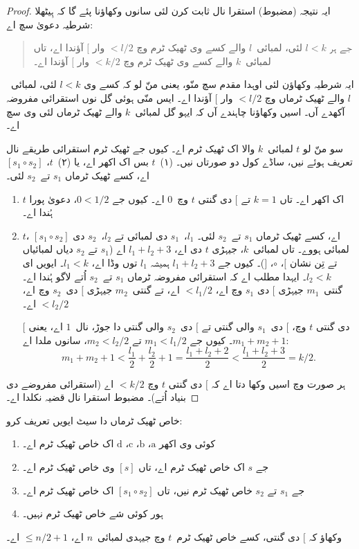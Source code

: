 \documentclass[../../../include/open-logic-section]{subfiles}
\begin{document}
\begin{proof}
ایہ نتیجہ (مضبوط) استقرا نال ثابت کرن لئی سانوں وکھاؤنا پئے گا کہ ہِیٹھلا شرطیہ دعویٰ سچ اے:
\begin{quote}
  جے ہر $l < k$ لئی، لمبائی~$l$ والے کسے وی ٹھیک ٹرم وچ $< l/2$ وار $[$ آؤندا اے، تاں لمبائی~$k$ والے کسے وی ٹھیک ٹرم وچ $< k/2$ وار $[$ آؤندا اے۔
\end{quote}
ایہ شرطیہ وکھاؤن لئی اوہدا مقدم سچ منّو، یعنی منّ لو کہ کسے وی $l<k$ لئی، لمبائی~$l$ والے ٹھیک ٹرماں وچ $< l/2$ وار $[$ آؤندا اے۔ ایس منّی ہوئی گل نوں استقرائی مفروضہ آکھدے آں۔ اسیں وکھاؤنا چاہندے آں کہ ایہو گل لمبائی~$k$ والے ٹھیک ٹرماں لئی وی سچ اے۔

سو منّ لو $t$ لمبائی~$k$ والا اک ٹھیک ٹرم اے۔ کیوں جے ٹھیک ٹرم استقرائی طریقے نال تعریف ہوئے نیں، ساڈے کول دو صورتاں نیں۔ (۱)~$t$ بس اک اکھر اے، یا (۲)~$t$، $[s_1 \circ s_2]$ اے، کسے ٹھیک ٹرماں $s_1$ تے~$s_2$ لئی۔
\begin{enumerate}
\item $t$ اک اکھر اے۔ تاں $k = 1$ تے $[$ دی گنتی $t$ وچ~$0$ اے۔ کیوں جے $0 < 1/2$، دعویٰ پورا ہُندا اے۔
\item $t$، $[s_1 \circ s_2]$ اے، کسے ٹھیک ٹرماں $s_1$ تے~$s_2$ لئی۔ $l_1$،~$s_1$ دی لمبائی تے $l_2$،~$s_2$ دی لمبائی ہووے۔ تاں لمبائی~$k$، جیہڑی $t$ دی اے، $l_1+l_2+3$ اے ($s_1$ تے $s_2$ دیاں لمبائیاں تے تِن نشان $[$، $\circ$، $]$)۔ کیوں جے $l_1+l_2+3$ ہمیشہ $l_1$ توں وڈا اے، $l_1 < k$۔ ایویں ای $l_2
  < k$۔ ایہدا مطلب اے کہ استقرائی مفروضہ ٹرماں $s_1$ تے~$s_2$ اُتے لاگو ہُندا اے۔ گنتی~$m_1$ جیہڑی $[$ دی $s_1$ وچ اے، $< l_1/2$ اے، تے گنتی~$m_2$ جیہڑی $[$ دی~$s_2$ وچ اے، $< l_2/2$ اے۔

  $[$ دی گنتی $t$ وچ، $[$ دی~$s_1$ والی گنتی تے $[$ دی~$s_2$ والی گنتی دا جوڑ، نال~$1$ اے، یعنی $m_1 + m_2 + 1$۔ کیوں جے $m_1
  < l_1/2$ تے $m_2 < l_2/2$، سانوں ملدا اے:
  \[
  m_1 + m_2 + 1 < \frac{l_1}{2} + \frac{l_2}{2} + 1 = \frac{l_1+l_2+2}{2} < \frac{l_1+l_2+3}{2} = k/2.
  \]
\end{enumerate}
ہر صورت وچ اسیں وکھا دتا اے کہ $[$ دی گنتی $t$ وچ $< k/2$ اے (استقرائی مفروضے دی بنیاد اُتے)۔ مضبوط استقرا نال قضیہ نکلدا اے۔
\end{proof}

\begin{prob}
  خاص ٹھیک ٹرماں دا سیٹ ایویں تعریف کرو:
  \begin{enumerate}
  \item کوئی وی اکھر $\mathrm{a}$، $\mathrm{b}$، $\mathrm{c}$، $\mathrm{d}$ اک خاص ٹھیک ٹرم اے۔
  \item جے $s$ اک خاص ٹھیک ٹرم اے، تاں $[s]$ وی خاص ٹھیک ٹرم اے۔
  \item جے $s_1$ تے $s_2$ خاص ٹھیک ٹرم نیں، تاں $[s_1 \circ s_2]$ اک خاص ٹھیک ٹرم اے۔
  \item ہور کوئی شے خاص ٹھیک ٹرم نہیں۔
  \end{enumerate}
  وکھاؤ کہ $[$ دی گنتی، کسے خاص ٹھیک ٹرم~$t$ وچ جیہدی لمبائی~$n$ اے، $\le n/2 +1$ اے۔
\end{prob}
\end{document}

